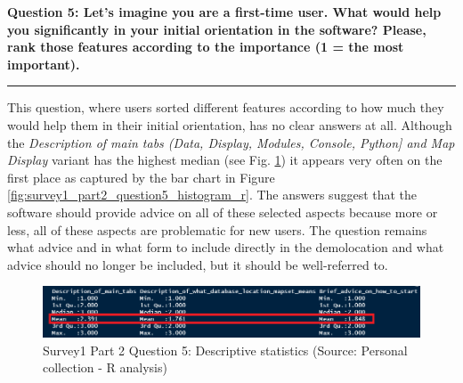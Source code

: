 \documentclass[a4paper,10pt,twoside]{article}
\begin{document}
\newpage
\noindent \textbf{Question 5: Let's imagine you are a first-time user. What would help you significantly in your initial orientation in the software? Please, rank those features according to the importance (1 = the most important).}
\par\noindent\rule{\textwidth}{0.4pt}

\noindent This question, where users sorted different features according to how much they would help them in their initial orientation, has no clear answers at all. Although the \textit{Description of main tabs (Data, Display, Modules, Console, Python] and Map Display} variant has the highest median (see Fig. \ref{fig:survey1_part2_question5_stats}) it appears very often on the first place as captured by the bar chart in Figure \ref{fig:survey1_part2_question5_histogram_r}. The answers suggest that the software should provide advice on all of these selected aspects because more or less, all of these aspects are problematic for new users. The question remains what advice and in what form to include directly in the demolocation and what advice should no longer be included, but it should be well-referred to.
    
\vspace{0.3cm}
\begin{figure}[hbt!] 
\begin{center}
\includegraphics[width=16cm]{../surveys/analyzed_data/survey1_part2_question5_stats.png} 
\caption[Survey1 Part 2 Question 5: Descriptive statistics]{Survey1 Part 2 Question 5: Descriptive statistics (Source: Personal collection - R analysis)}
\label{fig:survey1_part2_question5_stats}
\end{center}
\end{figure}
\end{document}
